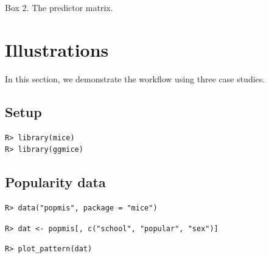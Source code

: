 \documentclass[
  article]{jss}
\begin{document}
\begin{tcolorbox}[enhanced jigsaw, bottomrule=.15mm, breakable, arc=.35mm, colback=white, left=2mm, toprule=.15mm, rightrule=.15mm, leftrule=.75mm, opacityback=0]

Box 2. The predictor matrix.

\end{tcolorbox}

\hypertarget{sec-illustrations}{%
\section{Illustrations}\label{sec-illustrations}}

In this section, we demonstrate the workflow using three case studies.

\hypertarget{setup}{%
\subsection{Setup}\label{setup}}

\begin{verbatim}
R> library(mice)
R> library(ggmice)
\end{verbatim}

\hypertarget{popularity-data}{%
\subsection{Popularity data}\label{popularity-data}}

\begin{verbatim}
R> data("popmis", package = "mice")
\end{verbatim}

\begin{verbatim}
R> dat <- popmis[, c("school", "popular", "sex")] 
\end{verbatim}

\begin{verbatim}
R> plot_pattern(dat)
\end{verbatim}
\end{document}
